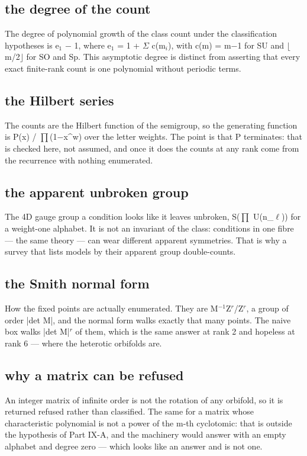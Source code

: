 \documentclass[11pt,a4paper]{article}
\begin{document}
\subsection*{the degree of the count}
The degree of polynomial growth of the class count under the classification hypotheses is e\ensuremath{{}_{1}} \ensuremath{-} 1, where e\ensuremath{{}_{1}} = 1 + \ensuremath{\Sigma} c(m\ensuremath{{}_{i}}), with c(m) = m\ensuremath{-}1 for SU and \ensuremath{\lfloor}m/2\ensuremath{\rfloor} for SO and Sp. This asymptotic degree is distinct from asserting that every exact finite-rank count is one polynomial without periodic terms.

\subsection*{the Hilbert series}
The counts are the Hilbert function of the semigroup, so the generating function is P(x) / \ensuremath{\prod}(1\ensuremath{-}x\textasciicircum{}w) over the letter weights. The point is that P terminates: that is checked here, not assumed, and once it does the counts at any rank come from the recurrence with nothing enumerated.

\subsection*{the apparent unbroken group}
The 4D gauge group a condition looks like it leaves unbroken, S(\ensuremath{\prod} U(n\_\ensuremath{\ell})) for a weight-one alphabet. It is not an invariant of the class: conditions in one fibre --- the same theory --- can wear different apparent symmetries. That is why a survey that lists models by their apparent group double-counts.

\subsection*{the Smith normal form}
How the fixed points are actually enumerated. They are M\ensuremath{{}^{-1}}Z\ensuremath{{}^{r}}/Z\ensuremath{{}^{r}}, a group of order |det M|, and the normal form walks exactly that many points. The naive box walks |det M|\ensuremath{{}^{r}} of them, which is the same answer at rank 2 and hopeless at rank 6 --- where the heterotic orbifolds are.

\subsection*{why a matrix can be refused}
An integer matrix of infinite order is not the rotation of any orbifold, so it is returned refused rather than classified. The same for a matrix whose characteristic polynomial is not a power of the m-th cyclotomic: that is outside the hypothesis of Part IX-A, and the machinery would answer with an empty alphabet and degree zero --- which looks like an answer and is not one.
\end{document}

